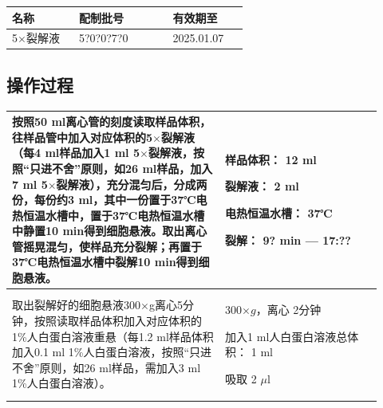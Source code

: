 \documentclass[UTF8,10pt,a4paper,fontset=fandol]{ctexart}
\newcommand{\fieldvalue}[1]{#1}
\newcommand{\handwritten}[1]{#1}
\begin{document}
\begin{center}
\small
\begin{tabular}{|p{0.25\linewidth}|p{0.35\linewidth}|p{0.28\linewidth}|}
\hline
名称 & 配制批号 & 有效期至 \\
\hline
5$\times$裂解液 &
\fieldvalue{\handwritten{5?0?0?7?0}} &
\fieldvalue{\handwritten{2025.01.07}} \\
\hline
\end{tabular}
\end{center}

\subsection*{操作过程}

\begin{tabular}{|p{0.53\linewidth}|p{0.39\linewidth}|}
\hline
按照50 ml离心管的刻度读取样品体积，往样品管中加入对应体积的5$\times$裂解液（每4 ml样品加入1 ml 5$\times$裂解液，按照“只进不舍”原则，如26 ml样品，加入7 ml 5$\times$裂解液），充分混匀后，分成两份，每份约3 ml，其中一份置于37℃电热恒温水槽中，置于37℃电热恒温水槽中静置10 min得到细胞悬液。取出离心管摇晃混匀，使样品充分裂解；再置于37℃电热恒温水槽中裂解10 min得到细胞悬液。 &
样品体积：
\fieldvalue{\handwritten{12}} ml

裂解液：
\fieldvalue{\handwritten{2}} ml

电热恒温水槽：
\fieldvalue{\handwritten{37}}℃

裂解：
\fieldvalue{\handwritten{9?}} min --- 
\fieldvalue{\handwritten{17:??}} \\
\hline
取出裂解好的细胞悬液300$\times$g离心5分钟，按照读取样品体积加入对应体积的1\%人白蛋白溶液重悬（每1.2 ml样品体积加入0.1 ml 1\%人白蛋白溶液，按照“只进不舍”原则，如26 ml样品，需加入3 ml 1\%人白蛋白溶液）。 &
\fieldvalue{\handwritten{300}}$\times g$，离心
\fieldvalue{\handwritten{2}}分钟

加入1 ml人白蛋白溶液总体积：
\fieldvalue{\handwritten{1}} ml

吸取
\fieldvalue{\handwritten{2}} $\mu$l \\
\hline
\end{tabular}
\end{document}
